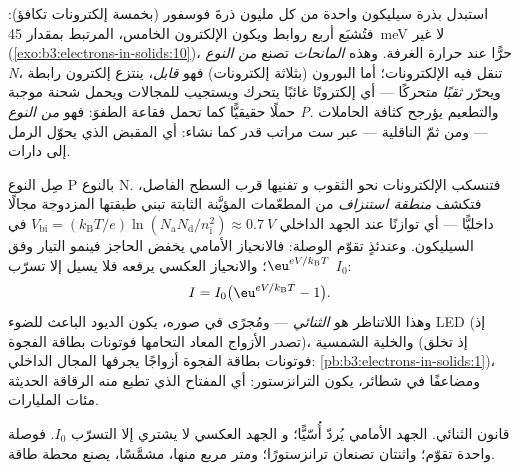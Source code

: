 \begin{definition}[التطعيم]\label{def:b3:electrons-in-solids:doping}
استبدل بذرة سيليكون واحدة من كل مليون ذرةَ فوسفور (بخمسة إلكترونات
تكافؤ): فتُشبَع أربع روابط ويكون الإلكترون الخامس،
المرتبط بمقدار \qty{45}{meV} لا غير
(\cref{exo:b3:electrons-in-solids:10})، حرًّا عند حرارة
الغرفة. وهذه \emph{المانحات} تصنع  \emph{من النوع N}،
تنقل فيه الإلكترونات؛ أما البورون (بثلاثة إلكترونات)
فهو \emph{قابل}، ينتزع إلكترون رابطة ويحرّر
\emph{ثقبًا} متحركًا --- أي إلكترونًا غائبًا يتحرك ويستجيب
للمجالات ويحمل شحنة موجبة حملًا حقيقيًّا كما تحمل فقاعة
الطفوَ: فهو \emph{من النوع P}. والتطعيم يؤرجح كثافة الحاملات
--- ومن ثمّ الناقلية --- عبر ست مراتب قدر
كما نشاء: أي المقبض الذي يحوّل الرمل إلى دارات.
\end{definition}

\begin{proposition}[وصلة PN]\label{prop:b3:electrons-in-solids:junction}
صِل النوع P بالنوع N. فتنسكب الإلكترونات نحو الثقوب و
تفنيها قرب السطح الفاصل، فتكشف \emph{منطقة استنزاف}
من المطعّمات المؤيَّنة الثابتة تبني طبقتها المزدوجة مجالًا
داخليًّا --- أي توازنًا عند الجهد الداخلي
$V_{\text{bi}} = (k_{\text{B}}T/e)
\ln(N_{\text{a}}N_{\text{d}}/n_{\text{i}}^2) \approx
\qty{0.7}{V}$ في السيليكون. وعندئذٍ تقوّم الوصلة: فالانحياز
الأمامي يخفض الحاجز فينمو التيار وفق
$\eu^{eV/k_{\text{B}}T}$؛ والانحياز العكسي يرفعه فلا يسيل إلا
تسرّب $I_0$:
\[
I = I_0\big(\eu^{eV/k_{\text{B}}T} - 1\big) .
\]
وهذا اللاتناظر هو \emph{الثنائي} --- ومُجرًى في صوره،
يكون الديود الباعث للضوء LED (إذ تصدر الأزواج المعاد التحامها فوتونات بطاقة الفجوة)، والخلية
الشمسية (إذ تخلق فوتونات بطاقة الفجوة أزواجًا يجرفها المجال
الداخلي: \cref{pb:b3:electrons-in-solids:1})، ومضاعفًا
في شطائر، يكون الترانزستور: أي المفتاح الذي تطبع منه
الرقاقة الحديثة مئات المليارات.
\end{proposition}
\admitted

\begin{omfigure}

{\small قانون الثنائي. الجهد الأمامي يُردّ أُسّيًّا؛ و
الجهد العكسي لا يشتري إلا التسرّب $I_0$. فوصلة واحدة
تقوّم؛ واثنتان تصنعان ترانزستورًا؛ ومتر مربع منها،
مشمَّسًا، يصنع محطة طاقة.}
\end{omfigure}

